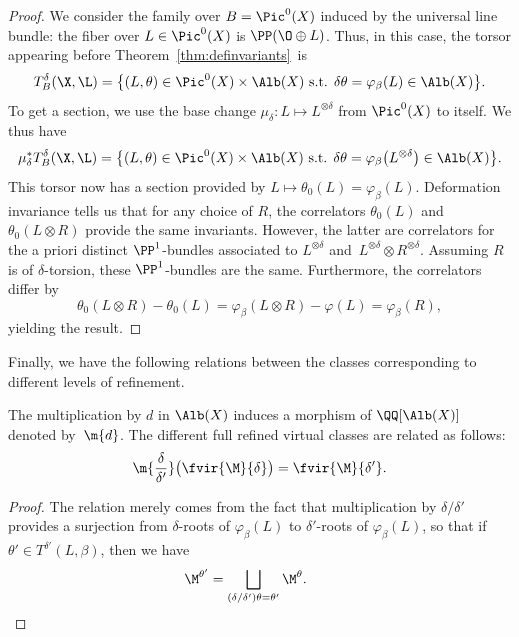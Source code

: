 \begin{proof}
We consider the family over $B=\Pic^0(X)$ induced by the universal line bundle: the fiber over $L\in\Pic^0(X)$ is $\PP(\O\oplus L)$. Thus, in this case, the torsor appearing before Theorem~\ref{thm:definvariants}~is
\[ T^\delta_B(\X,\L) = \big\{ (L,\theta)\in\Pic^0(X)\times\Alb(X) \text{ s.t. } \delta\theta=\varphi_\beta(L)\in\Alb(X)\big\}.
 \]
To get a section, we use the base change $\mu_\delta\colon L\mapsto L^{\otimes\delta}$ from $\Pic^0(X)$ to itself. We thus have
\[ \mu_\delta^*T^\delta_B(\X,\L) = \big\{ (L,\theta)\in\Pic^0(X)\times\Alb(X) \text{ s.t. } \delta\theta=\varphi_\beta\bigl(L^{\otimes\delta}\bigr)\in\Alb(X)\big\}. \]
This torsor now has a section provided by $L\mapsto\theta_0(L)=\varphi_\beta(L)$.
Deformation invariance tells us that for any choice of $R$, the correlators $\theta_0(L)$ and $\theta_0(L\otimes R)$ provide the same invariants. However, the latter are correlators for the a priori distinct $\PP^1$-bundles associated to $L^{\otimes\delta}$ and~${L^{\otimes\delta}\otimes R^{\otimes\delta}}$. Assuming $R$ is of $\delta$-torsion, these $\PP^1$-bundles are the same. Furthermore, the correlators differ by
\[ \theta_0(L\otimes R)-\theta_0(L) = \varphi_\beta(L\otimes R)-\varphi(L)=\varphi_\beta(R), \]
yielding the result.
\end{proof}

Finally, we have the following relations between the classes corresponding to different levels of refinement.

\begin{lem}\label{lem-unrefinement}
The multiplication by $d$ in $\Alb(X)$ induces a morphism of $\QQ[\Alb(X)]$ denoted by~$\m{d}$. The different full refined virtual classes are related as follows:
\[ \m{\frac{\delta}{\delta'}}\bigl(\fvir{\M}{\delta}\bigr) = \fvir{\M}{\delta'}. \]
\end{lem}

\begin{proof}
 The relation merely comes from the fact that multiplication by $\delta/\delta'$ provides a surjection from $\delta$-roots of $\varphi_\beta(L)$ to $\delta'$-roots of $\varphi_\beta(L)$, so that if $\theta'\in T^{\delta'}(L,\beta)$, then we have
 \[ \M^{\theta'}=\bigsqcup_{(\delta/\delta')\theta=\theta'}\M^{\theta}. \tag*{\qed}
 \]\renewcommand{\qed}{}
\end{proof}

